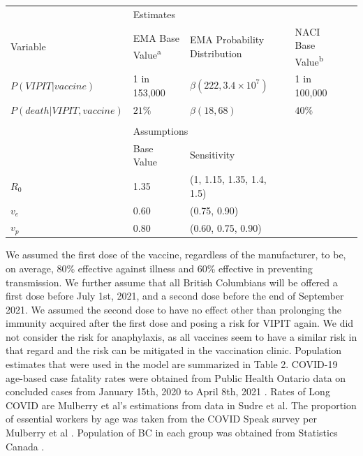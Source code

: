 \documentclass[]{interact}
\theoremstyle{plain}%
\theoremstyle{definition}
\theoremstyle{remark}
\begin{document}
\begin{table}
{\begin{tabular}{lllll} \toprule
 & \multicolumn{2}{l}{Estimates} \\ \cmidrule{2-4}
 Variable & EMA Base Value\textsuperscript{a} & EMA Probability Distribution & NACI Base Value\textsuperscript{b}  \\ \midrule
 $P(VIPIT|vaccine)$ & 1 in 153,000 & $\beta(222, 3.4\times 10^7)$ & 1 in 100,000 \\
 $P(death|VIPIT, vaccine)$ & $21\%$ &  $\beta(18, 68)$ & $40\%$ \\ \\
 & \multicolumn{2}{l}{Assumptions} \\ \cmidrule{2-4}
  & Base Value & Sensitivity & \\
 $R_0$ & 1.35 & (1, 1.15, 1.35, 1.4, 1.5) &  \\ 
 $v_e$ & 0.60 & (0.75, 0.90) &  \\ 
 $v_p$ & 0.80  & (0.60, 0.75, 0.90) &  \\ \bottomrule 

\end{tabular}}
\label{harm-param}
\end{table}

We assumed the first dose of the vaccine, regardless of the
manufacturer, to be, on average, 80\% effective against illness and 60\%
effective in preventing transmission. We further assume that all British
Columbians will be offered a first dose before July 1st, 2021, and a
second dose before the end of September 2021. We assumed the second dose
to have no effect other than prolonging the immunity acquired after the
first dose and posing a risk for VIPIT again. We did not consider the
risk for anaphylaxis, as all vaccines seem to have a similar risk in
that regard and the risk can be mitigated in the vaccination clinic.
Population estimates that were used in the model are summarized in Table
2. COVID-19 age-based case fatality rates were obtained from Public
Health Ontario data on concluded cases from January 15th, 2020 to April
8th, 2021 \citep{public_health_ontario_all_2021}. Rates of Long COVID
are Mulberry et al's estimations from data in Sudre et
al\citep{sudre_attributes_2021}. The proportion of essential workers by
age was taken from the COVID Speak survey per Mulberry et al
\citep{mulberry_vaccine_2021}. Population of BC in each group was
obtained from Statistics Canada \citep{statistics_canada_census_2017}.
\end{document}
